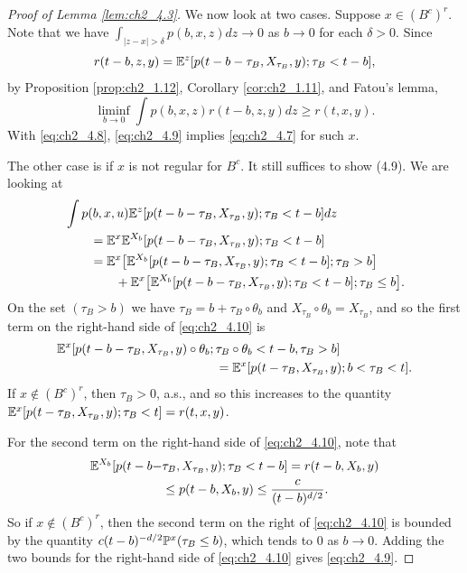 \begin{proof}[Proof of Lemma \ref{lem:ch2_4.3}]
We now look at two cases. Suppose $x \in (B^c)^r$. Note that we have $\int_{|z-x|>\delta}p(b,x,z)dz \to 0$ as $b \to 0$ for each $\delta > 0$. Since
\[
    r(t - b, z, y) = \E^z[p(t - b - \tau_B, X_{\tau_B}, y); \tau_B < t - b],
\]
by Proposition \ref{prop:ch2_1.12}, Corollary \ref{cor:ch2_1.11}, and Fatou's lemma,
\begin{equation}\label{eq:ch2_4.9}
    \liminf_{b\to0} \int p(b,x,z)r(t-b,z,y)dz \geq r(t,x,y).
\end{equation}
With \eqref{eq:ch2_4.8}, \eqref{eq:ch2_4.9} implies \eqref{eq:ch2_4.7} for such $x$.

The other case is if $x$ is not regular for $B^c$. It still suffices to show (4.9). We are looking at
\begin{align}\label{eq:ch2_4.10}
    &\int p(b,x,u)\E^z[p(t-b-\tau_B,X_{\tau_B},y);\tau_B < t-b]dz \\
    &\qquad= \E^x\E^{X_b}[p(t-b-\tau_B,X_{\tau_B},y);\tau_B < t-b] \notag \\
    &\qquad= \E^x\big[\E^{X_b}[p(t-b-\tau_B,X_{\tau_B},y);\tau_B < t-b];\tau_B > b\big] \notag \\
    &\qquad\qquad+ \E^x\big[\E^{X_b}[p(t-b-\tau_B,X_{\tau_B},y);\tau_B < t-b];\tau_B \leq b\big]. \notag
\end{align}
On the set $(\tau_B > b)$ we have $\tau_B = b + \tau_B \circ \theta_b$ and $X_{\tau_B} \circ \theta_b = X_{\tau_B}$, and so
the first term on the right-hand side of \eqref{eq:ch2_4.10} is
\begin{align*}
    \E^x[p(t-b-\tau_B,X_{\tau_B},y) \circ \theta_b;\,&\tau_B \circ \theta_b < t-b,\tau_B > b] \\
    &= \E^x[p(t-\tau_B,X_{\tau_B},y);b < \tau_B < t].
\end{align*}
If $x \notin (B^c)^r$, then $\tau_B > 0$, a.s., and so this increases to the quantity $\E^x[p(t-\tau_B,X_{\tau_B},y);\tau_B < t] = r(t,x,y)$.

For the second term on the right-hand side of \eqref{eq:ch2_4.10}, note that
\begin{align*}
    \E^{X_b}[p(t-b-&\tau_B,X_{\tau_B},y);\tau_B < t-b] = r(t-b,X_b,y) \\
    &\leq p(t-b,X_b,y) \leq \frac{c}{(t-b)^{d/2}}.
\end{align*}
So if $x \notin (B^c)^r$, then the second term on the right of \eqref{eq:ch2_4.10} is bounded by the quantity $c(t-b)^{-d/2}\P^x(\tau_B \leq b)$, which tends to $0$ as $b \to 0$. Adding the two bounds for the right-hand side of \eqref{eq:ch2_4.10} gives \eqref{eq:ch2_4.9}.
\end{proof}

